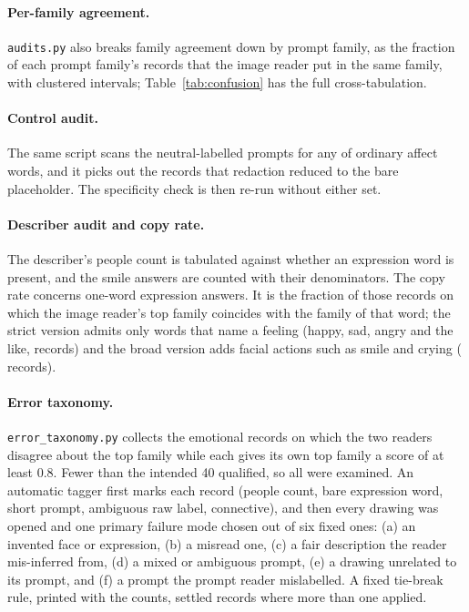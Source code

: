 \paragraph{Per-family agreement.} \texttt{audits.py} also breaks family agreement down by prompt family, as the fraction of each prompt family's records that the image reader put in the same family, with clustered intervals; Table~\ref{tab:confusion} has the full cross-tabulation.

\paragraph{Control audit.} The same script scans the \CtrlN{} neutral-labelled prompts for any of \CtrlLexicon{} ordinary affect words, and it picks out the \CtrlNameOnly{} records that redaction reduced to the bare placeholder. The specificity check is then re-run without either set.

\paragraph{Describer audit and copy rate.} The describer's people count is tabulated against whether an expression word is present, and the smile answers are counted with their denominators. The copy rate concerns one-word expression answers. It is the fraction of those records on which the image reader's top family coincides with the family of that word; the strict version admits only words that name a feeling (happy, sad, angry and the like, \DescBareStrictN{} records) and the broad version adds facial actions such as smile and crying (\DescBareBroadN{} records).

\paragraph{Error taxonomy.} \texttt{error\_taxonomy.py} collects the emotional records on which the two readers disagree about the top family while each gives its own top family a score of at least 0.8. Fewer than the intended 40 qualified, so all were examined. An automatic tagger first marks each record (people count, bare expression word, short prompt, ambiguous raw label, connective), and then every drawing was opened and one primary failure mode chosen out of six fixed ones: (a) an invented face or expression, (b) a misread one, (c) a fair description the reader mis-inferred from, (d) a mixed or ambiguous prompt, (e) a drawing unrelated to its prompt, and (f) a prompt the prompt reader mislabelled. A fixed tie-break rule, printed with the counts, settled records where more than one applied.

